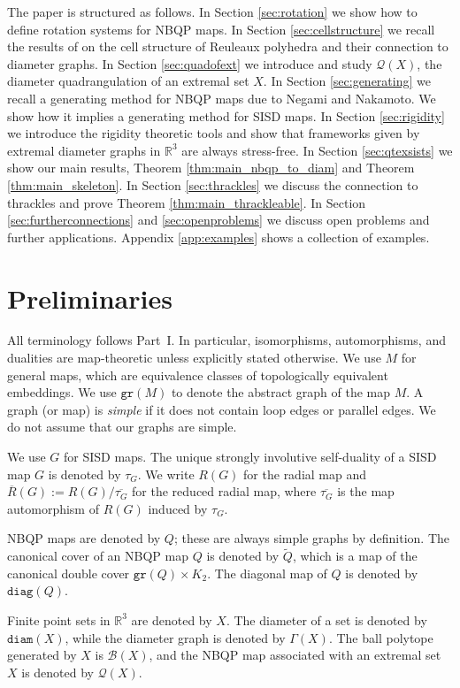 \documentclass[10pt,a4paper]{article}
\newcounter{example}
\newcommand{\R}[0]{\mathbb{R}}
\newcommand{\Bc}[0]{\mathcal{B}}
\newcommand{\diam}[0]{\mathtt{diam}}
\newcommand{\diag}[0]{\mathtt{diag}}
\newcommand{\qt}{\mathcal{Q}}
\newcommand{\gr}{\mathtt{gr}}
\begin{document}
The paper is structured as follows. In Section \ref{sec:rotation} we show how to define rotation systems for NBQP maps. In Section \ref{sec:cellstructure} we recall the results of \cite{kupitz2010ball} on the cell structure of Reuleaux polyhedra and their connection to diameter graphs. In Section \ref{sec:quadofext} we introduce and study $\qt(X)$, the diameter quadrangulation of an extremal set $X$.   In Section \ref{sec:generating} we recall a generating method for NBQP maps due to Negami and Nakamoto. We show how it implies a generating method for SISD maps. In Section \ref{sec:rigidity} we introduce the rigidity theoretic tools and show that frameworks given by extremal diameter graphs in $\R^3$ are always stress-free. In Section \ref{sec:qtexsists} we show our main results, Theorem \ref{thm:main_nbqp_to_diam} and Theorem \ref{thm:main_skeleton}. In Section \ref{sec:thrackles} we discuss the connection to thrackles and prove Theorem \ref{thm:main_thrackleable}. In Section \ref{sec:furtherconnections} and \ref{sec:openproblems} we discuss open problems and further applications. Appendix \ref{app:examples} shows a collection of examples. 



\section{Preliminaries}


All terminology follows Part~I. In particular, isomorphisms, automorphisms, and dualities are map-theoretic unless explicitly stated otherwise. We use $M$ for general maps, which are equivalence classes of topologically equivalent embeddings.  We use $\gr(M)$ to denote the abstract graph of the map $M$. A graph (or map) is \emph{simple} if it does not contain loop edges or parallel edges. We do not assume that our graphs are simple.

We use $G$ for SISD maps. The unique strongly involutive self-duality of a SISD map $G$ is denoted by $\tau_G$.  We write $R(G)$ for the radial map and $\overline R(G):=R(G)/\overline{\tau_G}$ for the reduced radial map, where $\overline{\tau_G}$ is the map automorphism of $R(G)$ induced by $\tau_G$. 

 NBQP maps are denoted by $Q$; these are always simple graphs by definition. The canonical cover of an NBQP map $Q$ is denoted by $\widetilde Q$, which is a map of the canonical double cover $\gr(Q)\times K_2$. The diagonal map of $Q$ is denoted by $\diag(Q)$.

Finite point sets in $\R^3$ are denoted by $X$.  The diameter of a set is denoted by $\diam(X)$, while the diameter graph is denoted by $\Gamma(X)$.  The ball polytope generated by $X$ is $\Bc(X)$, and the NBQP map associated with an extremal set $X$ is denoted by $\qt(X)$.    
  
\end{document}
